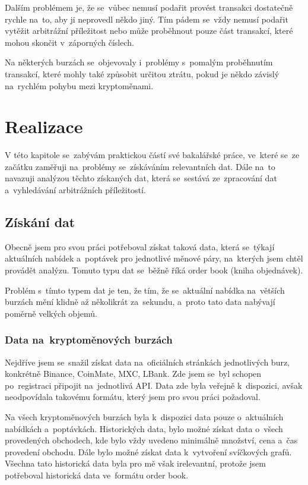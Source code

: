 \documentclass[thesis=B,czech]{FITthesis}[2019/03/21]
\begin{document}
Dalším problémem je, že se~vůbec nemusí podařit provést transakci dostatečně rychle na~to, aby ji neprovedl někdo jiný. Tím pádem se~vždy nemusí podařit vytěžit arbitrážní příležitost nebo může proběhnout pouze část transakcí, které mohou skončit v~záporných číslech.

Na některých burzách se~objevovaly i~problémy s~pomalým proběhnutím transakcí, které mohly také způsobit určitou ztrátu, pokud je někdo závislý na~rychlém pohybu mezi kryptoměnami. \cite{finder}

\chapter{Realizace}
V této kapitole se~zabývám praktickou částí své bakalářské práce, ve~které se~ze začátku zaměřuji na~problémy se~získáváním relevantních dat. Dále na~to navazuji analýzou těchto získaných dat, která se~sestává ze~zpracování dat a~vyhledávání arbitrážních příležitostí.

\section{Získání dat}
Obecně jsem pro svou práci potřeboval získat taková data, která se~týkají aktuálních nabídek a~poptávek pro jednotlivé měnové páry, na~kterých jsem chtěl provádět analýzu. Tomuto typu dat se~běžně říká order book (kniha objednávek).

Problém s~tímto typem dat je ten, že tím, že se~aktuální nabídka na~větších burzách mění klidně až několikrát za~sekundu, a~proto tato data nabývají poměrně velkých objemů.

\subsection{Data na~kryptoměnových burzách}
Nejdříve jsem se~snažil získat data na~oficiálních stránkách jednotlivých burz, konkrétně Binance, CoinMate, MXC, LBank. Zde jsem se~byl schopen po~registraci připojit na~jednotlivá API. Data zde byla veřejně k~dispozici, avšak neodpovídala takovému formátu, který jsem pro svou práci požadoval. 

Na všech kryptoměnových burzách byla k~dispozici data pouze o~aktuálních nabídkách a~poptávkách. Historických data, bylo možné získat data o~všech provedených obchodech, kde bylo vždy uvedeno minimálně množství, cena a~čas provedení obchodu. Dále bylo možné získat data k~vytvoření svíčkových grafů. Všechna tato historická data byla pro mě však irelevantní, protože jsem potřeboval historická data ve~formátu order book.
\end{document}
